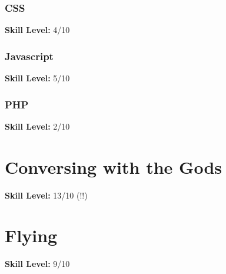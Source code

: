 \documentclass[12pt,a4paper]{report}
\begin{document}
\subsubsection{CSS}
{\textbf {Skill Level:}} 4/10 \\
\lipsum[12]
\subsubsection{Javascript}
{\textbf {Skill Level:}} 5/10 \\
\lipsum[13]
\subsubsection{PHP}
{\textbf {Skill Level:}} 2/10 \\
\lipsum[14]

\section{Conversing with the Gods}
{\textbf {Skill Level:}} 13/10 (!!)\\
\lipsum[15]

\section{Flying}
{\textbf {Skill Level:}} 9/10 \\
\lipsum[16]
\end{document}

